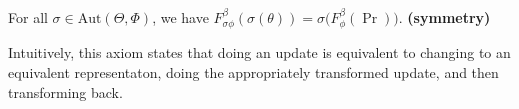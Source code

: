 \documentclass{article}
\begin{document}
\begin{URaxioms}
    \item
        For all $\sigma
            \in \mathrm{Aut}(\Theta, \Phi)$, we have
        $F^\beta_{\sigma\phi} (\sigma(\theta)) = \sigma \Big( F^\beta_{\phi}(\Pr)\Big)$.
            \hfill \textbf{(symmetry)} \label{ax:symmetry}
        \\
\end{URaxioms}

Intuitively, this axiom states that doing an update is equivalent to changing to an equivalent representaton, doing the appropriately transformed update, and then transforming back.

\end{document}
